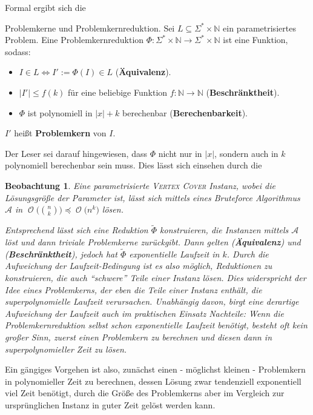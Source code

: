 \documentclass[a4paper,ngerman]{atseminar}
\newcommand{\N}{\ensuremath{\mathbb{N}}\xspace}
\newcommand{\BigO}[1]{\ensuremath{\operatorname{\mathcal{O}}\bigl(#1\bigr)}\xspace}
\newtheorem{observation}[theorem]{\textbf{Beobachtung}}
\begin{document}
\noindent
Formal ergibt sich die

\begin{definition}{Problemkerne und Problemkernreduktion.}
  \label{OE:def:kernel}
  Sei $L  \subseteq \Sigma^* \times \N$ ein parametrisiertes Problem.
  Eine Problemkernreduktion $ \Phi: \Sigma^* \times \N \rightarrow \Sigma^* \times \N $ ist eine Funktion, sodass:
  \begin{itemize}
      \item $I \in L \iff I' := \Phi(I) \in L $ (\textbf{Äquivalenz}).
      \item $|I'| \leq f(k)$ für eine beliebige Funktion $f: \N \rightarrow \N$ (\textbf{Beschränktheit}).
      \item $\Phi$ ist polynomiell in $|x| + k$ berechenbar (\textbf{Berechenbarkeit}).
  \end{itemize}

  \noindent
  $I'$ heißt \textbf{Problemkern} von $I$.
\end{definition}

\noindent
Der Leser sei darauf hingewiesen, dass $\Phi$ nicht nur in $|x|$, sondern auch in $k$ polynomiell berechenbar sein muss.
Dies lässt sich einsehen durch die
\begin{observation}

  Eine parametrisierte \textsc{Vertex Cover} Instanz, wobei die Lösungsgröße der Parameter ist, lässt sich mittels eines
  Bruteforce Algorithmus $\mathcal{A}$ in $\BigO{\binom{n}{k}} \preceq \BigO{n^k}$ lösen.

  \noindent
  Entsprechend lässt sich eine Reduktion $\tilde{\Phi}$ konstruieren, die Instanzen mittels $\mathcal{A}$ löst und dann triviale
  Problemkerne zurückgibt.
  Dann gelten (\textbf{Äquivalenz}) und (\textbf{Beschränktheit}), jedoch hat $\tilde{\Phi}$ exponentielle Laufzeit in $k$.
  \noindent
  Durch die Aufweichung der Laufzeit-Bedingung ist es also möglich, Reduktionen zu konstruieren, die auch \enquote{schwere} Teile einer Instanz lösen.
  Dies widerspricht der Idee eines Problemkerns, der eben die Teile einer Instanz enthält, die superpolynomielle Laufzeit verursachen.
  Unabhängig davon, birgt eine derartige Aufweichung der Laufzeit auch im praktischen Einsatz Nachteile: Wenn die Problemkernreduktion selbst
  schon exponentielle Laufzeit benötigt, besteht oft kein großer Sinn, zuerst einen Problemkern zu berechnen und diesen dann in superpolynomieller Zeit
  zu lösen.
\end{observation}

\noindent
Ein gängiges Vorgehen ist also, zunächst einen - möglichst kleinen - Problemkern in polynomieller Zeit zu berechnen, dessen Lösung zwar tendenziell exponentiell viel Zeit benötigt,
durch die Größe des Problemkerns aber im Vergleich zur ursprünglichen Instanz in guter Zeit gelöst werden kann.
\end{document}
